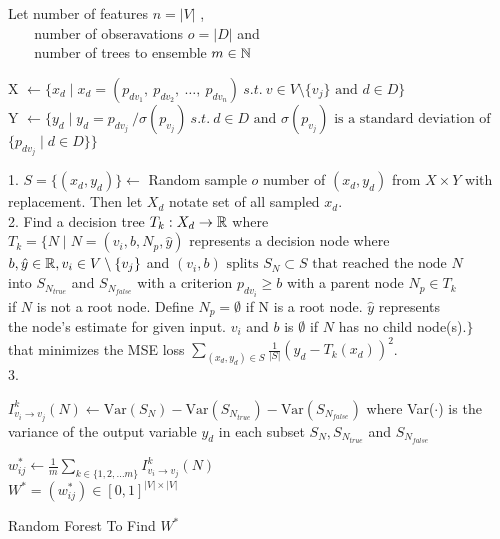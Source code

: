 \clearpage
\begin{algorithm}[H]
    \DontPrintSemicolon

    Let number of features $n = |V|$ , \\
    $\:\:\:\:\:\:\:$ number of obseravations $o = |D|$ and \\
    $\:\:\:\:\:\:\:$ number of trees to ensemble $ m \in \Bbb N$

     {
        X $\gets \{ x_d \mid x_d = (p_{dv_1},\: p_{dv_2},\: \ldots, \:p_{dv_{n}}) \: s.t. \: v \in V \setminus{\{v_j\}} \text{ and } d \in D \} \:$  \\
        Y $\gets \{ y_d  \mid y_d = p_{dv_j} \: / \sigma(p_{v_j}) \: s.t. \: d \in D \text{ and } \sigma(p_{v_j}) \text{ is a standard deviation of }$ \\
        $\{ p_{dv_j} \mid d \in D \} \}$\\

         {
            1. $S = \{(x_d, y_d)\} \gets $ Random sample $o$ number of $(x_d, y_d)$ from $X \times Y$ with replacement. Then let $X_d$ notate set of all sampled $x_d$. \\
            2. Find a decision tree $T_k: X_d \to \Bbb R$ where\\
            $T_k = \{ N \mid N = (v_i, b, N_p, \hat{y}) $ represents a decision node where \\ 
            $ b, \hat{y} \in \Bbb R, v_i \in V \setminus{\{v_j\}} $ and $(v_i, b) \text{ splits } S_N \subset S \text{ that reached the node } N $\\
            into $S_{N_{true}}$ and $S_{N_{false}}$ with a criterion $p_{dv_i} \ge b$ with a parent node $ N_p \in T_k$ \\             if $N$ is not a root node. Define $N_p = \emptyset$ if N is a root node. $\hat{y}$ represents \\
            the node's estimate for given input. $v_i$ and $b$ is $\emptyset$ if $N$ has no child node(s).$\}$\\
            that minimizes the MSE loss $\sum_{(x_d, y_d) \in S} \frac{1}{|S|}(y_d - T_k(x_d))^2$.\\
            3.
             {
                {
                    $I^k_{v_i \to v_j}(N) \gets \text{Var}(S_N) - \text{Var}(S_{N_{true}}) - \text{Var}(S_{N_{false}})$ where Var($\cdot$) is the variance
                    of the output variable $y_d$ in each subset $S_N, S_{N_{true}}$ and $S_{N_{false}}$           
                } 

            }
    
        }
    }
     $w^*_{ij} \gets \frac{1}{m}\sum_{k \in \{ 1, 2, ... m\}} I^k_{v_i \to v_j}(N)$ \\
     $W^* = (w^*_{ij}) \in [0,1]^{|V| \times |V|}$
    \caption{Random Forest To Find $W^*$}
\end{algorithm}